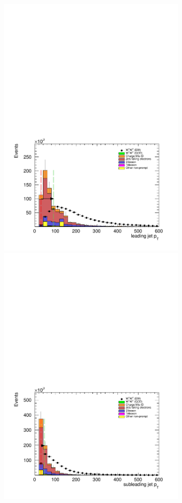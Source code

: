 \begin{figure}[htp]
  \centering
  \includegraphics[width=0.8\textwidth]{figs/ssww_upgrade/optimization_plots/jet0pt}\\
  \includegraphics[width=0.8\textwidth]{figs/ssww_upgrade/optimization_plots/jet1pt}

\end{figure}

